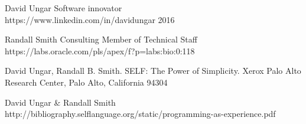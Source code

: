 \documentclass[12pt]{article}
\begin{document}
\newpage
\begin{thebibliography}{9}
 David Ungar Software innovator\\ https://www.linkedin.com/in/davidungar 2016

 Randall Smith Consulting Member of Technical Staff \\ https://labs.oracle.com/pls/apex/f?p=labs:bio:0:118

 David Ungar, Randall B. Smith. SELF: The Power of Simplicity. Xerox Palo Alto Research Center, Palo Alto, California 94304

 David Ungar & Randall Smith \\ http://bibliography.selflanguage.org/static/programming-as-experience.pdf

\end{thebibliography}
\end{document}
